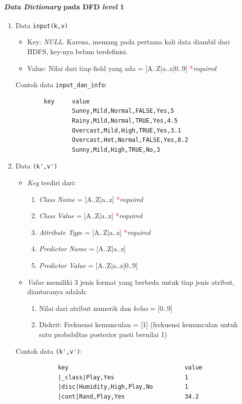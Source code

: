 \paragraph{\textit{Data Dictionary} pada DFD \textit{level} 1}
\begin{enumerate}
	\item{Data \verb|input(k,v)|}
		\begin{itemize}
			\item Key: \textit{NULL}. Karena, memang pada pertama kali data diambil dari HDFS, key-nya belum terdefinisi.
			\item Value: Nilai dari tiap field yang ada = [A..Z|a..z|0..9] \textcolor{red}{*}\textit{required}
		\end{itemize}
		Contoh data \verb|input_dan_info|:
		\begin{lstlisting}
		key		value		
				Sunny,Mild,Normal,FALSE,Yes,5
				Rainy,Mild,Normal,TRUE,Yes,4.5
				Overcast,Mild,High,TRUE,Yes,3.1
				Overcast,Hot,Normal,FALSE,Yes,8.2
				Sunny,Mild,High,TRUE,No,3
		\end{lstlisting}
	\item{Data \verb|(k',v')|}
		\begin{itemize}
			\item \textit{Key} terdiri dari:
			\begin{enumerate}
				\item \textit{Class Name} = [A..Z|a..z] \textcolor{red}{*}\textit{required}
				\item \textit{Class Value} = [A..Z|a..z] \textcolor{red}{*}\textit{required}
				\item \textit{Attribute Type} = [A..Z|a..z] \textcolor{red}{*}\textit{required}
				\item \textit{Predictor Name} = [A..Z|a..z]
				\item \textit{Predictor Value} = [A..Z|a..z|0..9]
			\end{enumerate}
			\item \textit{Value} memiliki 3 jenis format yang berbeda untuk tiap jenis atribut, diantaranya adalah: 
			\begin{enumerate}
				\item Nilai dari atribut numerik dan \textit{kelas} = [0..9]
				\item Diskrit: Frekuensi kemunculan = [1] (frekuensi kemunculan untuk satu probabiltas posterior pasti bernilai 1)
			\end{enumerate}
		\end{itemize}
			Contoh data \verb|(k',v')|:
			\begin{lstlisting}
			key									value		
			|_class|Play,Yes					1
			|disc|Humidity,High,Play,No			1
			|cont|Rand,Play,Yes					34.2
			\end{lstlisting}


\end{enumerate}
